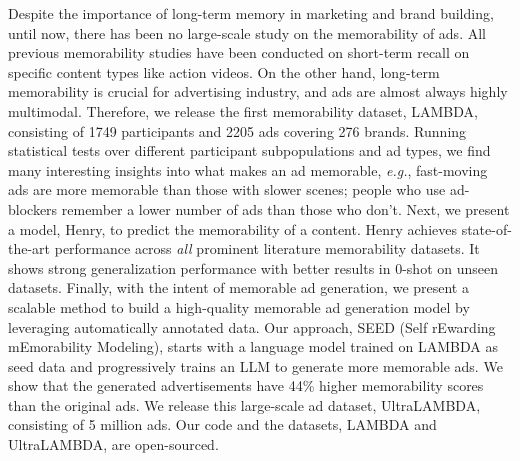  Despite the importance of long-term memory in marketing and brand building, until now, there has been no large-scale study on the memorability of ads. All previous memorability studies have been conducted on short-term recall on specific content types like action videos. On the other hand, long-term memorability is crucial for advertising industry, and ads are almost always highly multimodal. Therefore, we release the first memorability dataset, LAMBDA, consisting of 1749 participants and 2205 ads covering 276 brands. Running statistical tests over different participant subpopulations and ad types, we find many interesting insights into what makes an ad memorable, \textit{e.g.}, fast-moving ads are more memorable than those with slower scenes; people who use ad-blockers remember a lower number of ads than those who don't. Next, we present a model, Henry, to predict the memorability of a content. Henry achieves state-of-the-art performance across \textit{all} prominent literature memorability datasets. It shows strong generalization performance with better results in 0-shot on unseen datasets. Finally, with the intent of memorable ad generation, we present a scalable method to build a high-quality memorable ad generation model by leveraging automatically annotated data. Our approach, SEED (Self rEwarding mEmorability Modeling), starts with a language model trained on LAMBDA as seed data and progressively trains an LLM to generate more memorable ads. We show that the generated advertisements have 44\% higher memorability scores than the original ads. We release this large-scale ad dataset, UltraLAMBDA, consisting of 5 million ads. Our code and the datasets, LAMBDA and UltraLAMBDA, are open-sourced. %




